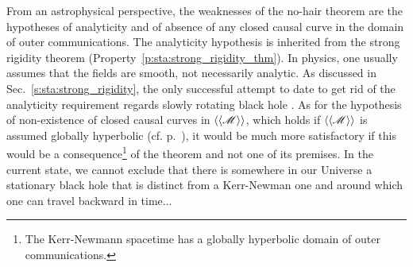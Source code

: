 From an astrophysical perspective, the weaknesses of the no-hair theorem are
the hypotheses of analyticity and of absence of any closed causal curve
in the domain of outer communications. The analyticity hypothesis is
inherited from the strong rigidity theorem (Property~\ref{p:sta:strong_rigidity_thm}).
In physics, one usually assumes that the fields are smooth, not necessarily
analytic. As discussed in Sec.~\ref{s:sta:strong_rigidity}, the only successful
attempt to date to get rid of the analyticity requirement regards slowly rotating
black hole \cite{AlexaIK14}. As for the hypothesis of non-existence of closed
causal curves in $\langle\langle \mathscr{M}\rangle\rangle$, which holds if
$\langle\langle \mathscr{M}\rangle\rangle$
is assumed globally hyperbolic (cf. p.~\pageref{d:sta:glob_hyperbol}),
it would be much more satisfactory if this would be a consequence\footnote{The Kerr-Newmann spacetime has a globally hyperbolic domain of outer
communications.} of the theorem and not one of its premises.
In the current state, we cannot exclude that there is somewhere in our Universe
a stationary black hole that is distinct from a Kerr-Newman one and around
which one can travel backward in time...

